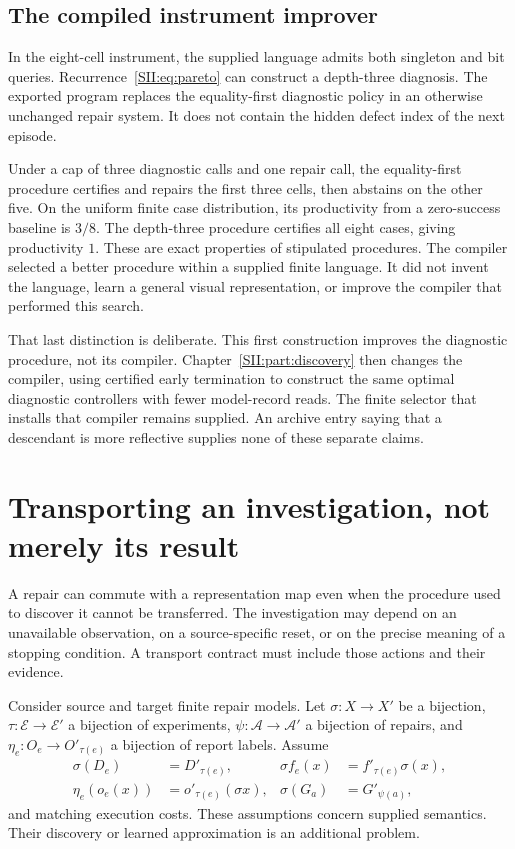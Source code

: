 \subsection{The compiled instrument improver}
In the eight-cell instrument, the supplied language admits both singleton and bit queries. Recurrence~\eqref{SII:eq:pareto} can construct a depth-three diagnosis. The exported program replaces the equality-first diagnostic policy in an otherwise unchanged repair system. It does not contain the hidden defect index of the next episode.

Under a cap of three diagnostic calls and one repair call, the equality-first procedure certifies and repairs the first three cells, then abstains on the other five. On the uniform finite case distribution, its productivity from a zero-success baseline is $3/8$. The depth-three procedure certifies all eight cases, giving productivity $1$. These are exact properties of stipulated procedures. The compiler selected a better procedure within a supplied finite language. It did not invent the language, learn a general visual representation, or improve the compiler that performed this search.

That last distinction is deliberate. This first construction improves the diagnostic procedure, not its compiler. Chapter~\ref{SII:part:discovery} then changes the compiler, using certified early termination to construct the same optimal diagnostic controllers with fewer model-record reads. The finite selector that installs that compiler remains supplied. An archive entry saying that a descendant is more reflective supplies none of these separate claims.

\section{Transporting an investigation, not merely its result}\label{SII:sec:transport}
A repair can commute with a representation map even when the procedure used to discover it cannot be transferred. The investigation may depend on an unavailable observation, on a source-specific reset, or on the precise meaning of a stopping condition. A transport contract must include those actions and their evidence.

Consider source and target finite repair models. Let $\sigma:X\to X'$ be a bijection, $\tau:\mathcal E\to\mathcal E'$ a bijection of experiments, $\psi:\mathcal A\to\mathcal A'$ a bijection of repairs, and $\eta_e:O_e\to O'_{\tau(e)}$ a bijection of report labels. Assume
\begin{align}\label{SII:eq:transport}
\sigma(D_e)&=D'_{\tau(e)}, &
\sigma f_e(x)&=f'_{\tau(e)}\sigma(x),\\
\eta_e(o_e(x))&=o'_{\tau(e)}(\sigma x), &
\sigma(G_a)&=G'_{\psi(a)},\nonumber
\end{align}
and matching execution costs. These assumptions concern supplied semantics. Their discovery or learned approximation is an additional problem.

